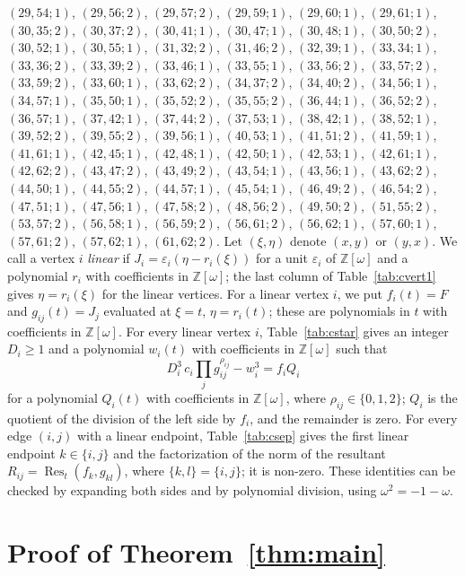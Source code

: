 \documentclass[11pt]{article}
\newcommand{\Z}{\mathbb{Z}}
\begin{document}
$(29,54;1)$, $(29,56;2)$, $(29,57;2)$, $(29,59;1)$, $(29,60;1)$, $(29,61;1)$, $(30,35;2)$, $(30,37;2)$, $(30,41;1)$, $(30,47;1)$, $(30,48;1)$, $(30,50;2)$, $(30,52;1)$, $(30,55;1)$, $(31,32;2)$, $(31,46;2)$, $(32,39;1)$, $(33,34;1)$, $(33,36;2)$, $(33,39;2)$, $(33,46;1)$, $(33,55;1)$, $(33,56;2)$, $(33,57;2)$, $(33,59;2)$, $(33,60;1)$, $(33,62;2)$, $(34,37;2)$, $(34,40;2)$, $(34,56;1)$, $(34,57;1)$, $(35,50;1)$, $(35,52;2)$, $(35,55;2)$, $(36,44;1)$, $(36,52;2)$, $(36,57;1)$, $(37,42;1)$, $(37,44;2)$, $(37,53;1)$, $(38,42;1)$, $(38,52;1)$, $(39,52;2)$, $(39,55;2)$, $(39,56;1)$, $(40,53;1)$, $(41,51;2)$, $(41,59;1)$, $(41,61;1)$, $(42,45;1)$, $(42,48;1)$, $(42,50;1)$, $(42,53;1)$, $(42,61;1)$, $(42,62;2)$, $(43,47;2)$, $(43,49;2)$, $(43,54;1)$, $(43,56;1)$, $(43,62;2)$, $(44,50;1)$, $(44,55;2)$, $(44,57;1)$, $(45,54;1)$, $(46,49;2)$, $(46,54;2)$, $(47,51;1)$, $(47,56;1)$, $(47,58;2)$, $(48,56;2)$, $(49,50;2)$, $(51,55;2)$, $(53,57;2)$, $(56,58;1)$, $(56,59;2)$, $(56,61;2)$, $(56,62;1)$, $(57,60;1)$, $(57,61;2)$, $(57,62;1)$, $(61,62;2)$.
Let $(\xi,\eta)$ denote $(x,y)$ or $(y,x)$. We call a vertex $i$ \emph{linear} if $J_i=\varepsilon_i(\eta-r_i(\xi))$ for a unit $\varepsilon_i$ of $\Z[\omega]$ and a polynomial $r_i$ with coefficients in $\Z[\omega]$; the last column of Table~\ref{tab:cvert1} gives $\eta=r_i(\xi)$ for the linear vertices. For a linear vertex $i$, we put $f_i(t)=F$ and $g_{ij}(t)=J_j$ evaluated at $\xi=t$, $\eta=r_i(t)$; these are polynomials in $t$ with coefficients in $\Z[\omega]$.
For every linear vertex $i$, Table~\ref{tab:cstar} gives an integer $D_i\geq1$ and a polynomial $w_i(t)$ with coefficients in $\Z[\omega]$ such that
\begin{equation}\label{eq:cstarlin}
D_i^3\,c_i\prod_jg_{ij}^{\rho_{ij}}-w_i^3=f_iQ_i
\end{equation}
for a polynomial $Q_i(t)$ with coefficients in $\Z[\omega]$, where $\rho_{ij}\in\{0,1,2\}$; $Q_i$ is the quotient of the division of the left side by $f_i$, and the remainder is zero.
For every edge $(i,j)$ with a linear endpoint, Table~\ref{tab:csep} gives the first linear endpoint $k\in\{i,j\}$ and the factorization of the norm of the resultant $R_{ij}=\operatorname{Res}_t(f_k,g_{kl})$, where $\{k,l\}=\{i,j\}$; it is non-zero.
These identities can be checked by expanding both sides and by polynomial division, using $\omega^2=-1-\omega$.

\section{Proof of Theorem~\ref{thm:main}}
\end{document}

